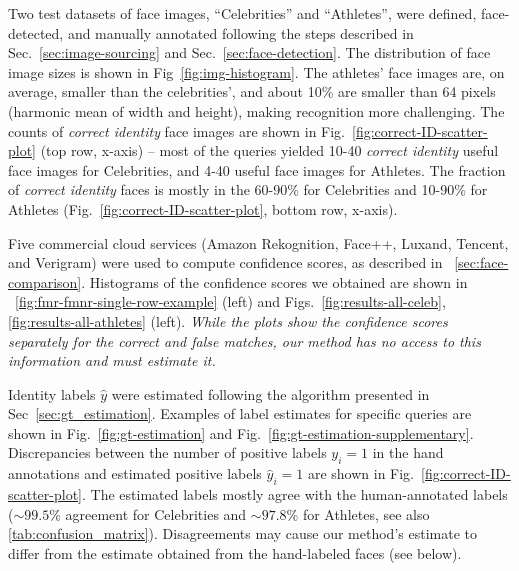 \documentclass[10pt,twocolumn,letterpaper]{article}
\newcommand*{\simsym}{\mathord\sim}
\begin{document}
Two test datasets of face images, ``Celebrities'' and ``Athletes'', were defined, face-detected, and manually annotated following the steps described in Sec.~\ref{sec:image-sourcing} and Sec.~\ref{sec:face-detection}. 
The distribution of face image sizes is shown in Fig~\ref{fig:img-histogram}. The athletes' face images are, on average, smaller than the celebrities', and about 10\% are smaller than 64 pixels (harmonic mean of width and height), making recognition more challenging. The counts of \textit{correct identity} face images are shown in Fig.~\ref{fig:correct-ID-scatter-plot} (top row, x-axis) -- most of the queries yielded 10-40 {\em correct identity} useful face images for Celebrities, and 4-40 useful face images for Athletes. The fraction of \textit{correct identity} faces is mostly in the 60-90\% for Celebrities and 10-90\% for Athletes (Fig.~\ref{fig:correct-ID-scatter-plot}, bottom row, x-axis).

Five commercial cloud services (Amazon Rekognition, Face++, Luxand, Tencent, and Verigram) were used to compute confidence scores, as described in ~\cref{sec:face-comparison}. Histograms of the confidence scores we obtained are shown in ~\cref{fig:fmr-fmnr-single-row-example} (left) and Figs.~\ref{fig:results-all-celeb}, \ref{fig:results-all-athletes} (left). {\em While the plots show the confidence scores separately for the correct and false matches, our method has no access to this information and must estimate it.} 

Identity labels $\hat{y}$ were estimated following the algorithm presented in Sec~\ref{sec:gt_estimation}. Examples of label estimates for specific queries are shown in Fig.~\ref{fig:gt-estimation} and Fig.~\ref{fig:gt-estimation-supplementary}. Discrepancies between the number of positive labels $y_i=1$ in the hand annotations and estimated positive labels $\hat{y}_i=1$ are shown in Fig.~\ref{fig:correct-ID-scatter-plot}. The estimated labels mostly agree with the human-annotated labels ($\simsym 99.5\%$ agreement for Celebrities and $\simsym 97.8\%$ for Athletes, see also \cref{tab:confusion_matrix}). 
Disagreements may cause our method's estimate to differ from the estimate obtained from the hand-labeled faces (see below).
\end{document}
